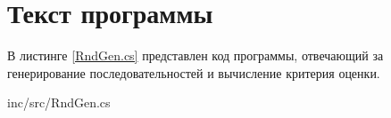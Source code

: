 \chapter{Текст программы}
В листинге \ref{RndGen.cs} представлен код программы, отвечающий за генерирование последовательностей и вычисление критерия оценки.

\begin{lstinputlisting}[
	caption={Код программы},
	label={RndGen.cs},
	language={[Sharp]C}
	]{inc/src/RndGen.cs}
\end{lstinputlisting}